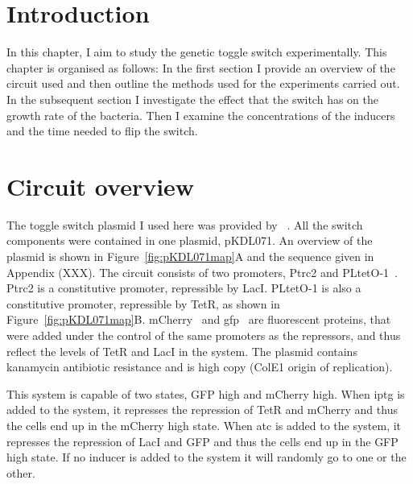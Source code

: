 \section{Introduction}
In this chapter, I aim to study the genetic toggle switch experimentally.  This chapter is organised as follows: In the first section I provide an overview of the circuit used and then outline the methods used for the experiments carried out. In the subsequent section I investigate the effect that the switch has on the growth rate of the bacteria. Then I examine the concentrations of the inducers and the time needed to flip the switch. 

\section{Circuit overview}

The toggle switch plasmid I used here was provided by ~\textcite{Litcofsky:2012gr}. All the switch components were contained in one plasmid, pKDL071. An overview of the plasmid is shown in Figure~\ref{fig:pKDL071map}A and the sequence given in Appendix (XXX). The circuit consists of two promoters, Ptrc2 and PLtetO-1~\autocite{Lutz:1997ti}. Ptrc2 is a constitutive promoter, repressible by LacI. PLtetO-1 is also a constitutive promoter, repressible by TetR, as shown in Figure~\ref{fig:pKDL071map}B. mCherry~\autocite{Shaner:2004vy} and \acrshort{gfp}~\autocite{SHIMOMURA:1962va} are fluorescent proteins, that were added under the control of the same promoters as the repressors, and thus reflect the levels of TetR and LacI in the system. The plasmid contains kanamycin antibiotic resistance and is high copy (ColE1 origin of replication).

This system is capable of two states, GFP high and mCherry high. When \acrshort{iptg} is added to the system, it represses the repression of TetR and mCherry and thus the cells end up in the mCherry high state. When \acrshort{atc} is added to the system, it represses the repression of LacI and GFP and thus the cells end up in the GFP high state. If no inducer is added to the system it will randomly go to one or the other. 


